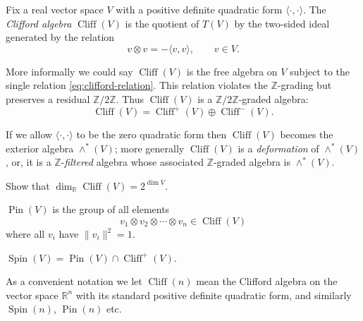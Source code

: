 \documentclass[12pt,letterpaper,reqno]{article}
\numberwithin{equation}{section}
\newcommand{\R}{\ensuremath{\mathbb R}}
\newcommand{\Z}{\ensuremath{\mathbb Z}}
\newcommand{\norm}[1]{\lVert#1\rVert}
\newcommand{\IP}[1]{\langle#1\rangle}
\newcommand{\ti}[1]{\textit{#1}}
\DeclareMathOperator{\Pin}{Pin}
\DeclareMathOperator{\Spin}{Spin}
\DeclareMathOperator{\Cliff}{Cliff}
\begin{document}
\begin{defn} Fix a real vector space $V$ with a positive definite
quadratic form $\IP{\cdot,\cdot}$. The \ti{Clifford algebra} $\Cliff(V)$ is the quotient
of $T(V)$ by the two-sided ideal generated by the relation
\begin{equation} \label{eq:clifford-relation}
  v \otimes v = -\IP{v,v}, \qquad v \in V.
\end{equation}
\end{defn}
More informally we could say $\Cliff(V)$ is the free algebra on $V$
subject to the single relation \eqref{eq:clifford-relation}.
This relation violates the $\Z$-grading but preserves a residual $\Z/2\Z$.
Thus $\Cliff(V)$ is a $\Z/2\Z$-graded algebra:
\begin{equation}
  \Cliff(V) = \Cliff^+(V) \oplus \Cliff^-(V).
\end{equation}


If we allow $\IP{\cdot,\cdot}$ to be the zero quadratic form then $\Cliff(V)$
becomes the exterior algebra $\wedge^*(V)$; more generally $\Cliff(V)$ is
a \ti{deformation} of $\wedge^*(V)$, or, it is a $\Z$-\ti{filtered} algebra 
whose associated $\Z$-graded algebra is $\wedge^*(V)$.

\begin{exercise} Show that $\dim_\R \Cliff(V) = 2^{\dim V}$.
\end{exercise}

\begin{defn} $\Pin(V)$ is the group of all elements
\begin{equation}
 v_1 \otimes v_2 \otimes \cdots \otimes v_n \in \Cliff(V)
\end{equation}
where all $v_i$ have $\norm{v_i}^2 = 1$.
\end{defn}

\begin{defn} $\Spin(V) = \Pin(V) \cap \Cliff^+(V)$.
\end{defn}

As a convenient notation we let $\Cliff(n)$ mean the Clifford algebra on the
vector space $\R^n$ with its standard positive definite quadratic form,
and similarly $\Spin(n)$, $\Pin(n)$ etc.
\end{document}

